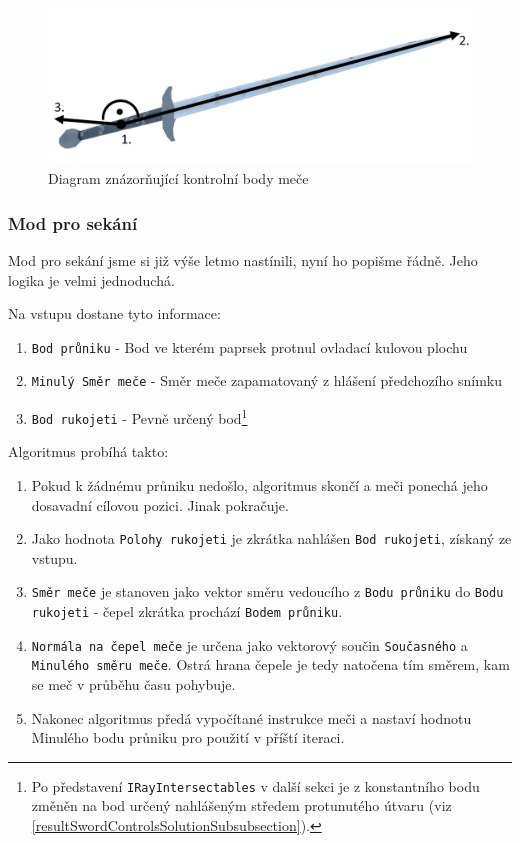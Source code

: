 \begin{figure}[ht]\centering
    \center
    \includegraphics[width=140mm]{../img/diagram-swordPositioning.png}
    \caption{Diagram znázorňující kontrolní body meče}
    \label{obr04:swordPositioningDiagram}
\end{figure} 


\subsubsection*{Mod pro sekání}

Mod pro sekání jsme si již výše letmo nastínili, nyní ho popišme řádně. Jeho logika je velmi jednoduchá.

Na vstupu dostane tyto informace:
\begin{enumerate}
    \item \texttt{Bod průniku} - Bod ve kterém paprsek protnul ovladací kulovou plochu
    \item \texttt{Minulý Směr meče} - Směr meče zapamatovaný z hlášení předchozího snímku
    \item \texttt{Bod rukojeti} - Pevně určený bod\footnote{Po představení \texttt{IRayIntersectables} v další sekci je z konstantního bodu změněn na bod určený nahlášeným středem protunutého útvaru (viz \ref{resultSwordControlsSolutionSubsubsection}).}
\end{enumerate}

Algoritmus probíhá takto:
\begin{enumerate}
    \addtocounter{enumi}{-1}
    \item Pokud k žádnému průniku nedošlo, algoritmus skončí a meči ponechá jeho dosavadní cílovou pozici. Jinak pokračuje.
    \item Jako hodnota \texttt{Polohy rukojeti} je zkrátka nahlášen \texttt{Bod rukojeti}, získaný ze vstupu.
    \item \texttt{Směr meče} je stanoven jako vektor směru vedoucího z \texttt{Bodu průniku} do \texttt{Bodu rukojeti} - čepel zkrátka prochází \texttt{Bodem průniku}.
    \item \texttt{Normála na čepel meče} je určena jako vektorový součin \texttt{Současného} a \texttt{Minulého směru meče}. Ostrá hrana čepele je tedy natočena tím směrem, kam se meč v průběhu času pohybuje. 
    \item Nakonec algoritmus předá vypočítané instrukce meči a nastaví hodnotu Minulého bodu průniku pro použití v příští iteraci.
\end{enumerate}

